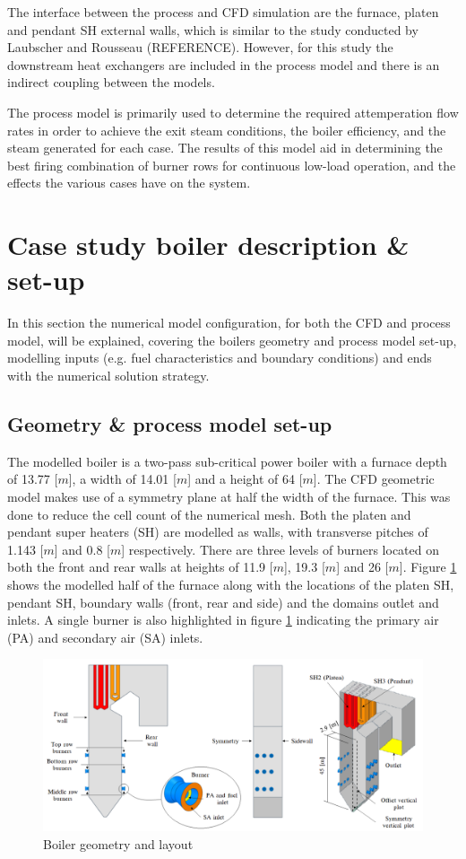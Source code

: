 \documentclass[review]{elsarticle}
\begin{document}
The interface between the process and CFD simulation are the furnace, platen and pendant SH external walls, which is similar to the study conducted by Laubscher and Rousseau (REFERENCE). However, for this study the downstream heat exchangers are included in the process model and there is an indirect coupling between the models.

The process model is primarily used to determine the required attemperation flow rates in order to achieve the exit steam conditions, the boiler efficiency, and the steam generated for each case. The results of this model aid in determining the best firing combination of burner rows for continuous low-load operation, and the effects the various cases have on the system.

\section{Case study boiler description \& set-up}
In this section the numerical model configuration, for both the CFD and process model, will be explained, covering the boilers geometry and process model set-up,  modelling inputs (e.g. fuel characteristics and boundary conditions) and ends with the numerical solution strategy.
\newpage
\subsection{Geometry \& process model set-up}
 
The modelled  boiler is a two-pass sub-critical power boiler with a furnace depth of 13.77 [$m$], a width of 14.01 [$m$] and a height of 64 [$m$]. The CFD geometric model makes use of a symmetry plane  at half the width of the furnace. This was done to reduce the cell count of the numerical mesh. Both the platen and pendant super heaters (SH) are modelled as walls, with transverse pitches of 1.143 [$m$] and 0.8 [$m$] respectively. There are three levels of burners located on both the front and rear walls at heights of 11.9 [$m$], 19.3 [$m$] and 26 [$m$]. Figure \ref{fig_geometry} shows the modelled half of the furnace along with the locations of the platen SH, pendant SH, boundary walls (front, rear and side) and the domains outlet and inlets. A single burner is also highlighted in figure \ref{fig_geometry} indicating the primary air (PA) and secondary air (SA) inlets. \\
\begin{figure} [h!]
\centering
\includegraphics[scale=0.5]{GEOMETRY}
\caption{Boiler geometry and layout}
\label{fig_geometry}
\end{figure}
\end{document}
